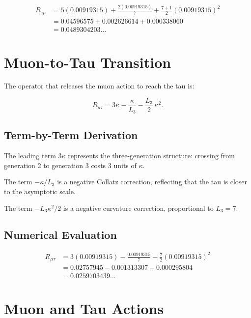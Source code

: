 \[
\begin{aligned}
R_{e\mu} &= 5(0.00919315) + \frac{2(0.00919315)}{7}
           + \frac{7+1}{2}(0.00919315)^2 \\[4pt]
        &= 0.04596575 + 0.002626614 + 0.000338060 \\[4pt]
        &= 0.0489304203\ldots
\end{aligned}
\]

\section{Muon-to-Tau Transition}

The operator that releases the muon action to reach the tau is:

\begin{equation}
R_{\mu\tau} = 3\kappa - \frac{\kappa}{L_3} - \frac{L_3}{2}\,\kappa^2.
\label{eq:Rmt}
\end{equation}

\subsection{Term-by-Term Derivation}

The leading term \(3\kappa\) represents the three-generation structure:
crossing from generation 2 to generation 3 costs 3 units of \(\kappa\).

The term \(-\kappa/L_3\) is a negative Collatz correction, reflecting that
the tau is closer to the asymptotic scale.

The term \(-L_3\kappa^2/2\) is a negative curvature correction,
proportional to \(L_3 = 7\).

\subsection{Numerical Evaluation}

\[
\begin{aligned}
R_{\mu\tau} &= 3(0.00919315) - \frac{0.00919315}{7}
              - \frac{7}{2}(0.00919315)^2 \\[4pt]
           &= 0.02757945 - 0.001313307 - 0.000295804 \\[4pt]
           &= 0.0259703439\ldots
\end{aligned}
\]

\section{Muon and Tau Actions}

